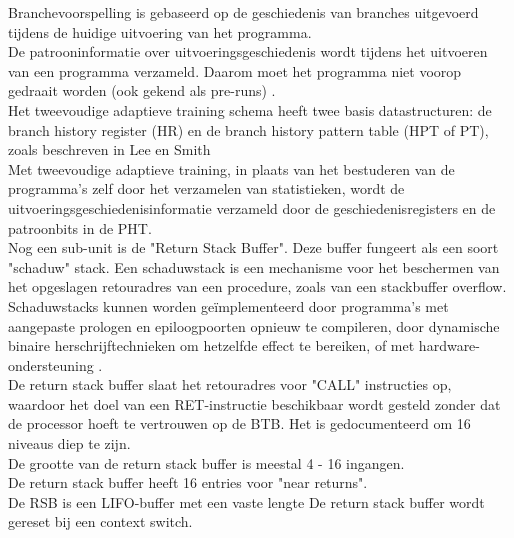 Branchevoorspelling is gebaseerd op de geschiedenis van
branches uitgevoerd tijdens de huidige uitvoering van
het programma.\\
De patrooninformatie over uitvoeringsgeschiedenis wordt tijdens het uitvoeren van een programma verzameld.
Daarom moet het programma niet voorop gedraait worden (ook gekend als pre-runs) 
\parencite{Yeh1991}.\\
Het tweevoudige adaptieve training schema heeft twee basis datastructuren: de branch history register (HR) en de branch history pattern table (HPT of PT), zoals beschreven in Lee en Smith \parencite{Lee1984} \\

Met tweevoudige adaptieve training, in plaats van het bestuderen van de programma's zelf door het verzamelen van statistieken, wordt de uitvoeringsgeschiedenisinformatie verzameld door de geschiedenisregisters en de patroonbits in de PHT.\\


Nog een sub-unit is de "Return Stack Buffer". Deze buffer fungeert als een soort "schaduw" stack.
Een schaduwstack is een mechanisme voor het beschermen van het opgeslagen retouradres van een procedure, zoals van een stackbuffer overflow.\\


Schaduwstacks kunnen worden geïmplementeerd door programma's met aangepaste prologen en epiloogpoorten opnieuw te compileren, door dynamische binaire herschrijftechnieken om hetzelfde effect te bereiken, of met hardware-ondersteuning \parencite{Sinnadurai2008}.\\

De return stack buffer slaat het retouradres voor "CALL" instructies op, waardoor het doel van een RET-instructie beschikbaar wordt gesteld zonder dat de processor hoeft te vertrouwen op de BTB. Het is gedocumenteerd om 16 niveaus diep te zijn.\\

De grootte van de return stack buffer is meestal 4 - 16 ingangen.\\

De return stack buffer heeft 16 entries voor "near returns".\\
De RSB is een LIFO-buffer met een vaste lengte
\parencite{Fog2018}
De return stack buffer wordt gereset bij een context switch.\\


